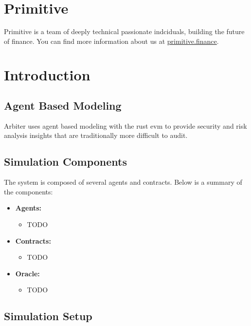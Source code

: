 \section{Primitive}\label{primitive}

Primitive is a team of deeply technical passionate indciduals, building
the future of finance.
You can find more information about us at \href{https://primitive.finance}{primitive.finance}.

\section{Introduction}\label{introduction}
\subsection{Agent Based Modeling}\label{agent-based-modeling}

Arbiter uses agent based modeling with the rust evm to provide security
and risk analysis insights that are traditionally more difficult to
audit. 

\subsection{Simulation Components}\label{simulation-components}

The system is composed of several agents and contracts. Below is a summary of the components:

\begin{itemize}
\item \textbf{Agents:}
  \begin{itemize}
  \item TODO
  \end{itemize}
\item \textbf{Contracts:}
  \begin{itemize}
  \item TODO
  \end{itemize}
\item \textbf{Oracle:}
  \begin{itemize}
  \item TODO
  \end{itemize}
\end{itemize}


\subsection{Simulation Setup}\label{simulation-setup}

